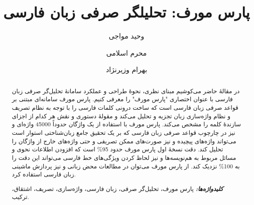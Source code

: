 \documentclass[12pt,onecolumn,a4paper]{article}
\providecommand{\keywords}[1]{\textbf{\textit{کلیدواژه‌ها:}} #1}
\begin{document}
    \title{پارس مورف: تحلیلگر صرفی زبان فارسی}
    \author[1]{وحید مواجی}
    \author[2]{محرم اسلامی}
    \author[1]{بهرام وزیرنژاد}
    \date{}
    \maketitle

    \begin{abstract}
        در مقالهٔ حاضر می‌کوشیم مبنای نظری، نحوهٔ طراحی و عملکرد سامانهٔ تحلیل‌گر صرفی زبان فارسی با عنوان اختصاری "پارس مورف" را معرفی کنیم. پارس مورف سامانه‌ای مبتنی بر قواعد صرفی زبان فارسی است که ساخت درونی کلمات فارسی را با توجه به نظام تصریف و نظام واژه‌سازی زبان تجزیه و تحلیل می‌کند و مقولهٔ دستوری و نقش هر کدام از اجزای سازندهٔ کلمه را مشخص می‌کند. پارس مورف با استفاده از یک واژگان حدوداً 45000 واژه‌‌ای و نیز در چارچوب قواعد صرفی زبان فارسی که بر یک تحقیق جامع زبان‌شناختی استوار است می‌تواند واژه‌های پیچیده و نیز صورت‌های ممکن تصریفی و حتی واژه‌های خارج از واژگان را تحلیل کند.
        دقت نسخهٔ اول پارس مورف حدود 95\% است که افزودن اطلاعات نحوی و مسائل مربوط به هم‌نویسه‌ها و نیز لحاظ کردن ویژگی‌های خط فارسی می‌تواند این دقت را به 100\% نزدیک کند. از پارس مورف می‌توان در مطالعات محض زبانی و نیز پردازش ماشینی زبان فارسی استفاده کرد.
        \par\noindent
        \keywords{ پارس مورف، تحلیل‌گر صرفی، زبان فارسی، واژه‌سازی، تصریف، اشتقاق، ترکیب.}
    \end{abstract}
\end{document}
